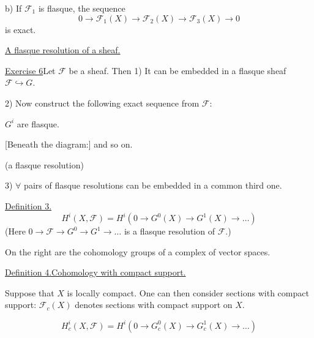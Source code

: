 b) If $\mathcal F_1$ is flasque, the sequence
\begin{equation*}
0\longrightarrow\mathcal F_1(X)\longrightarrow\mathcal F_2(X)\longrightarrow\mathcal F_3(X)\longrightarrow0
\end{equation*}
is exact.

\underline{A flasque resolution of a sheaf.}

\underline{Exercise 6}\quad Let $\mathcal F$ be a sheaf. Then 1) It can be embedded in
a flasque sheaf $\mathcal F\hookrightarrow G$.

2) Now construct the following exact sequence from $\mathcal F$:

\begin{center}
\end{center}
$G^i$ are flasque.

[Beneath the diagram:] and so on.

(a flasque resolution)

3) $\forall$ pairs of flasque resolutions can be embedded in a common third one.

\underline{Definition 3.}
\begin{equation*}
H^i(X,\mathcal F)=H^i(0\longrightarrow G^0(X)\longrightarrow G^1(X)\longrightarrow\ldots)
\end{equation*}
(Here $0\longrightarrow\mathcal F\longrightarrow G^0\longrightarrow G^1\longrightarrow\ldots$
is a flasque resolution of $\mathcal F$.)

On the right are the cohomology groups of a complex of vector spaces.

\underline{Definition 4.}
\underline{Cohomology with compact support.}

Suppose that $X$ is locally compact. One can then consider
sections with compact support:
$\mathcal F_c(X)$ denotes sections with compact support on $X$.


\begin{equation*}
H_c^i(X,\mathcal F)=H^i(0\longrightarrow G_c^0(X)\longrightarrow G_c^1(X)\longrightarrow\ldots)
\end{equation*}

